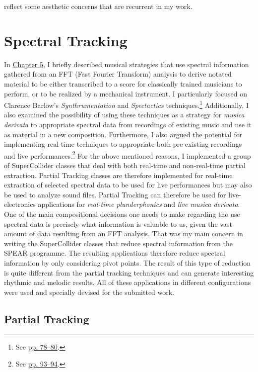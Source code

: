 reflect some aesthetic concerns that are recurrent in my work.

\section{Spectral Tracking}

In \hyperlink{chapter5}{Chapter 5}, I briefly described musical strategies that use spectral information gathered from an FFT (Fast Fourier Transform) analysis to derive notated material to be either transcribed to a score for classically trained musicians to perform, or to be realized by a mechanical instrument. I particularly focused on Clarence Barlow's \emph{Synthrumentation} and \emph{Spectactics} techniques.\footnote{See \hyperlink{spectactics}{pp. 78--80}.} Additionally, I also examined the possibility of using these techniques as a strategy for \emph{musica derivata} to appropriate spectral data from recordings of existing music and use it as material in a new composition. Furthermore, I also argued the potential for implementing real-time techniques to appropriate both pre-existing recordings and live performances.\footnote{See \hyperlink{realtimeplunderfuck}{pp. 93--94}.} For the above mentioned reasons, I implemented a group of SuperCollider classes that deal with both real-time and non-real-time partial extraction. Partial Tracking classes are therefore implemented for real-time extraction of selected spectral data to be used for live performances but may also be used to analyze sound files. Partial Tracking can therefore be used for live-electronics applications for \emph{real-time plunderphonics} and \emph{live musica derivata}. One of the main compositional decisions one needs to make regarding the use spectral data is precisely what information is valuable to us, given the vast amount of data resulting from an FFT analysis. That was my main concern in writing the SuperCollider classes that reduce spectral information from the SPEAR programme. The resulting applications therefore reduce spectral information by only considering pivot points. The result of this type of reduction is quite different from the partial tracking techniques and can generate interesting rhythmic and melodic results. All of these applications in different configurations were used and specially devised for the submitted work. 

\subsection{Partial Tracking}

